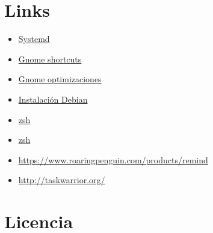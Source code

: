 \documentclass[12pt,spanish,]{scrartcl}
\providecommand{\tightlist}{%
  \setlength{\itemsep}{0pt}\setlength{\parskip}{0pt}}
\begin{document}
\hypertarget{links}{%
\section{Links}\label{links}}

\begin{itemize}
\tightlist
\item
  \href{https://wiki.debian.org/systemd}{Systemd}
\item
  \href{https://wiki.gnome.org/Design/OS/KeyboardShortcuts}{Gnome
  shortcuts}
\item
  \href{https://www.linux.com/learn/easy-steps-make-gnome-3-more-efficient}{Gnome
  optimizaciones}
\item
  \href{https://diversidadyunpocodetodo.blogspot.com.es/2015/03/sensores-temperatura-hardware-discos-cpu-debian-ubuntu.html}{Instalación
  Debian}
\item
  \href{http://joshldavis.com/2014/07/26/oh-my-zsh-is-a-disease-antigen-is-the-vaccine/}{zsh}
\item
  \href{http://blog.namangoel.com/zsh-with-antigen}{zsh}
\item
  \url{https://www.roaringpenguin.com/products/remind}
\item
  \url{http://taskwarrior.org/}
\end{itemize}

\hypertarget{licencia}{%
\section{Licencia}\label{licencia}}
\end{document}
